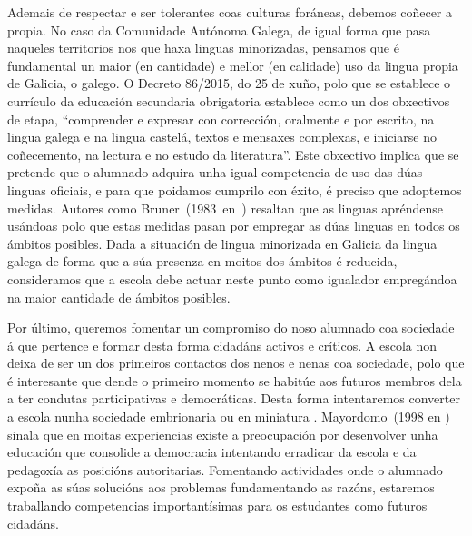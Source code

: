 Ademais de respectar e ser tolerantes coas culturas foráneas, debemos coñecer a propia. No caso da Comunidade Autónoma Galega, de igual forma que pasa naqueles territorios nos que haxa linguas minorizadas, pensamos que é fundamental un maior (en cantidade) e mellor (en calidade) uso da lingua propia de Galicia, o galego. O  Decreto 86/2015, do 25 de xuño, polo que se establece o currículo da educación secundaria obrigatoria establece como un dos obxectivos de etapa, ``comprender e expresar con corrección, oralmente e por escrito, na lingua galega e na lingua castelá, textos e mensaxes complexas, e iniciarse no coñecemento, na lectura e no estudo da literatura''. Este obxectivo implica que se pretende que o alumnado adquira unha igual competencia de uso das dúas linguas oficiais, e para que poidamos cumprilo con éxito, é preciso que adoptemos medidas. Autores como Bruner~(1983~en~) resaltan que as linguas apréndense usándoas polo que estas medidas pasan por empregar as dúas linguas en todos os ámbitos posibles. Dada a situación de lingua minorizada en Galicia da lingua galega de forma que a súa presenza en moitos dos ámbitos é reducida, consideramos que a escola debe actuar neste punto como igualador empregándoa na maior cantidade de ámbitos posibles.

Por último, queremos fomentar un compromiso do noso alumnado coa sociedade á que pertence e formar desta forma cidadáns activos e críticos. A escola non deixa de ser un dos primeiros contactos dos nenos e nenas coa sociedade, polo que é interesante que dende o primeiro momento se habitúe aos futuros membros dela a ter condutas participativas e democráticas. Desta forma intentaremos converter a escola nunha sociedade embrionaria ou en miniatura \cite{diazrelaciones}. Mayordomo~(1998 en ) sinala que en moitas experiencias existe a preocupación por desenvolver unha educación que consolide a democracia intentando erradicar da escola e da pedagoxía as posicións autoritarias. Fomentando actividades onde o alumnado expoña as súas solucións aos problemas fundamentando as razóns, estaremos traballando competencias importantísimas para os estudantes como futuros cidadáns.

